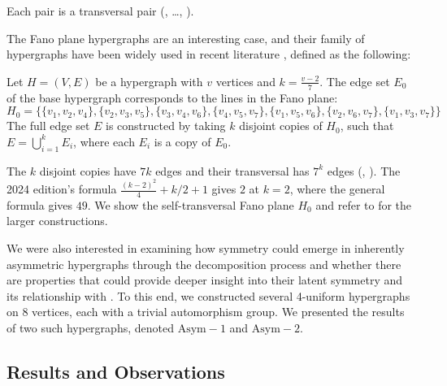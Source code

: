 Each pair is a transversal pair (, \dots, ).

The Fano plane hypergraphs are an interesting case, and their family of hypergraphs have been widely used in recent literature \cite{Uno24}, defined as the following:

\begin{definition}
Let $H=(V,E)$ be a hypergraph with $v$ vertices and $k=\frac{v-2}{7}$. The edge set $E_0$ of the base hypergraph corresponds to the lines in the Fano plane:
\[
H_0=\{\{v_1,v_2,v_4\},\{v_2,v_3,v_5\},\{v_3,v_4,v_6\},\{v_4,v_5,v_7\},\{v_1,v_5,v_6\},\{v_2,v_6,v_7\},\{v_1,v_3,v_7\}\}
\]
The full edge set $E$ is constructed by taking $k$ disjoint copies of $H_0$, such that $E=\bigcup_{i=1}^{k}E_i$, where each $E_i$ is a copy of $E_0$.
\end{definition}

The $k$ disjoint copies have $7k$ edges and their transversal has $7^k$ edges (, ). The 2024 edition's formula $\frac{(k-2)^2}{4}+k/2+1$ gives $2$ at $k=2$, where the general formula gives $49$. We show the self-transversal Fano plane $H_0$ and refer to \cite{Uno24} for the larger constructions.

We were also interested in examining how symmetry could emerge in inherently asymmetric hypergraphs through the decomposition process and whether there are properties that could provide deeper insight into their latent symmetry and its relationship with \FKA. To this end, we constructed several 4-uniform hypergraphs on 8 vertices, each with a trivial automorphism group. We presented the results of two such hypergraphs, denoted $\mathrm{Asym}-1$ and $\mathrm{Asym}-2$.

\subsection{Results and Observations}

